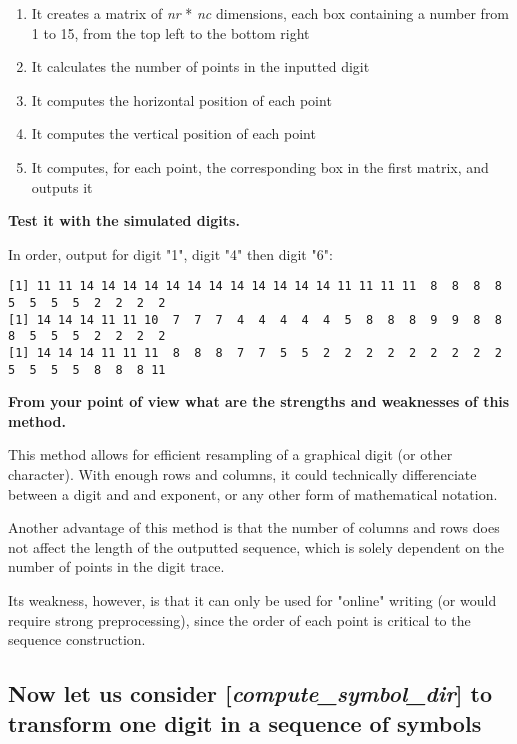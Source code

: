 \documentclass[a4paper]{article}
\begin{document}
\begin{enumerate}

\item It creates a matrix of {\it nr} * {\it nc} dimensions, each box containing a number from 1 to 15, from the top left to the bottom right
\item It calculates the number of points in the inputted digit
\item It computes the horizontal position of each point
\item It computes the vertical position of each point
\item It computes, for each point, the corresponding box in the first matrix, and outputs it

\end{enumerate}

\textbf{Test it with the simulated digits.} \newline

In order, output for digit "1", digit "4" then digit "6":

\begin{lstlisting}
[1] 11 11 14 14 14 14 14 14 14 14 14 14 14 14 11 11 11 11  8  8  8  8  5  5  5  5  2  2  2  2
[1] 14 14 14 11 11 10  7  7  7  4  4  4  4  4  5  8  8  8  9  9  8  8  8  5  5  5  2  2  2  2
[1] 14 14 14 11 11 11  8  8  8  7  7  5  5  2  2  2  2  2  2  2  2  2  5  5  5  5  8  8  8 11
\end{lstlisting}

\textbf{From your point of view what are the strengths and weaknesses of this method.} \newline

This method allows for efficient resampling of a graphical digit (or other character). With enough rows and columns, it could technically differenciate between a digit and and exponent, or any other form of mathematical notation. \newline

Another advantage of this method is that the number of columns and rows does not affect the length of the outputted sequence, which is solely dependent on the number of points in the digit trace.  \newline

Its weakness, however, is that it can only be used for "online" writing (or would require strong preprocessing), since the order of each point is critical to the sequence construction.

\subsection{Now let us consider [{\it compute\_symbol\_dir}] to transform one digit in a sequence of symbols}
\end{document}

